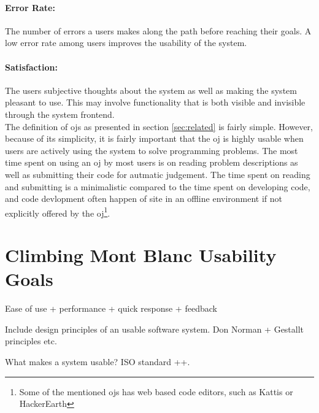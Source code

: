 \paragraph*{Error Rate:} The number of errors a users makes along the path before reaching their goals. A low error rate among users improves the usability of the system.

\paragraph*{Satisfaction:} The users subjective thoughts about the system as well as making the system pleasant to use. This may involve functionality that is both visible and invisible through the system frontend. \\


The definition of \gls{ojs} as presented in section \ref{sec:related} is fairly simple. However, because of its simplicity, it is fairly important that the \gls{oj} is highly usable when users are actively using the system to solve programming problems. The most time spent on using an \gls{oj} by most users is on reading problem descriptions as well as submitting their code for autmatic judgement. The time spent on reading and submitting is a minimalistic compared to the time spent on developing code, and code devlopment often happen of site in an offline environment if not explicitly offered by the \gls{oj}\footnote{Some of the mentioned \gls{ojs} has web based code editors, such as Kattis \cite{KATTIS} or HackerEarth\cite{HACKEREARTH}}. \\



\section{Climbing Mont Blanc Usability Goals}
\label{sec:cmb-usability}

Ease of use + performance + quick response + feedback

Include design principles of an usable software system. Don Norman + Gestallt principles etc.

What makes a system usable? ISO standard ++.
